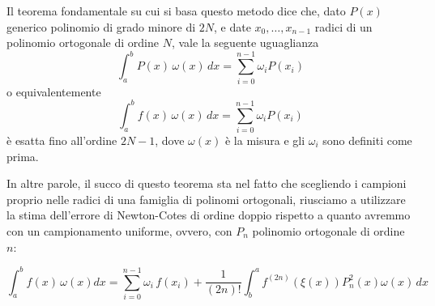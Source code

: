 \documentclass[a4paper,10pt]{article}
\begin{document}
Il teorema fondamentale su cui si basa questo metodo dice che, dato $P(x)$ generico polinomio di grado minore di $2N$, e date $x_0,\dots,x_{n-1}$ radici di un polinomio ortogonale di ordine $N$, vale la seguente uguaglianza
$$\int_a^b P(x)\,\omega(x)\,dx = \sum_{i=0}^{n-1} \omega_i P(x_i)$$
o equivalentemente
$$\int_a^b f(x)\,\omega(x)\,dx = \sum_{i=0}^{n-1} \omega_i P(x_i)$$
è esatta fino all'ordine $2N-1$, dove $\omega(x)$ è la misura e gli $\omega_i$ sono definiti come prima.

In altre parole, il succo di questo teorema sta nel fatto che scegliendo i campioni proprio nelle radici di una famiglia di polinomi ortogonali, riusciamo a utilizzare la stima dell'errore di Newton-Cotes di ordine doppio rispetto a quanto avremmo con un campionamento uniforme, ovvero, con $P_n$ polinomio ortogonale di ordine $n$:

$$\int_a^b f(x)\,\omega(x)dx = \sum_{i=0}^{n-1}\omega_i\,f(x_i) + \frac{1}{(2n)!}\int_b^a f^{(2n)}\left(\xi(x)\right)P_n^2(x)\omega(x)\,dx$$
\end{document}
